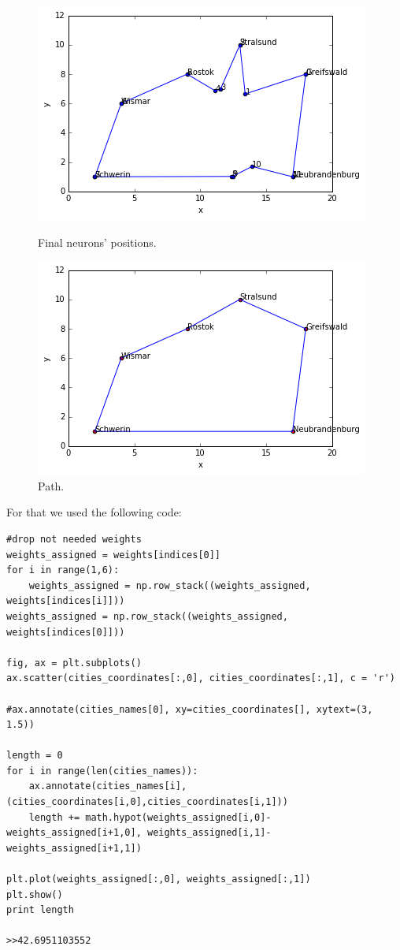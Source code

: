 \documentclass[a4paper, 12pt]{article}
\begin{document}
\begin{figure}[!htb]
  \includegraphics[width=\linewidth]{neuronsWithCities}
  \caption{Final neurons' positions.}\label{fig:neuronsWithCities}
\endminipage\hfill
{}
  \includegraphics[width=\linewidth]{path}
  \caption{Path.}\label{fig:path}
\endminipage\hfill
\end{figure}

For that we used the following code:

\lstset{language=Python}
\begin{lstlisting}[frame=single]
#drop not needed weights
weights_assigned = weights[indices[0]]
for i in range(1,6):
    weights_assigned = np.row_stack((weights_assigned, weights[indices[i]]))
weights_assigned = np.row_stack((weights_assigned, weights[indices[0]]))

fig, ax = plt.subplots()
ax.scatter(cities_coordinates[:,0], cities_coordinates[:,1], c = 'r')

#ax.annotate(cities_names[0], xy=cities_coordinates[], xytext=(3, 1.5))

length = 0
for i in range(len(cities_names)):
    ax.annotate(cities_names[i], (cities_coordinates[i,0],cities_coordinates[i,1]))
    length += math.hypot(weights_assigned[i,0]-weights_assigned[i+1,0], weights_assigned[i,1]-weights_assigned[i+1,1])

plt.plot(weights_assigned[:,0], weights_assigned[:,1])
plt.show()
print length

>>42.6951103552
\end{lstlisting}
\end{document}
